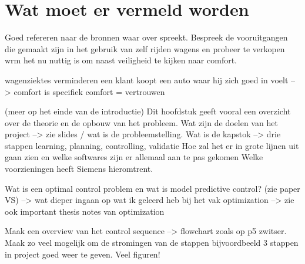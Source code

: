 \section{Wat moet er vermeld worden}
Goed refereren naar de bronnen waar over spreekt. Bespreek de vooruitgangen die gemaakt zijn in het gebruik van zelf rijden wagens en probeer te verkopen wrm het nu nuttig is om naast veiligheid te kijken naar comfort. 

wagenziektes verminderen
een klant koopt een auto waar hij zich goed in voelt --> comfort is specifiek
comfort = vertrouwen




(meer op het einde van de introductie)
Dit hoofdstuk geeft vooral een overzicht over de theorie en de opbouw van het probleem.
Wat zijn de doelen van het project --> zie slides / wat is de probleemstelling.
Wat is de kapstok --> drie stappen learning, planning, controlling, validatie
Hoe zal het er in grote lijnen uit gaan zien en welke softwares zijn er allemaal aan te pas gekomen
Welke voorzieningen heeft Siemens hieromtrent.

Wat is een optimal control problem en wat is model predictive control? (zie paper VS)
--> wat dieper ingaan op wat ik geleerd heb bij het vak optimization --> zie ook important thesis notes van optimization

Maak een overview van het control sequence --> flowchart zoals op p5 zwitser. Maak zo veel mogelijk om de stromingen van de stappen bijvoordbeeld 3 stappen in project goed weer te geven. Veel figuren!


